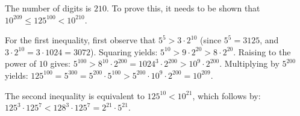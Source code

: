 The number of digits is $210$.
To prove this, it needs to be shown that
$10^{209} \leq 125^{100} < 10^{210}$.

For the first inequality, first observe that $5^5 > 3 \cdot 2^{10}$
(since $5^5 = 3125$, and $3 \cdot 2^{10} = 3 \cdot 1024 = 3072$).
Squaring yields:
$5^{10}
 > 9 \cdot 2^{20}
 > 8 \cdot 2^{20}$.
Raising to the power of $10$ gives:
$5^{100}
 > 8^{10} \cdot 2^{200}
 = 1024^3 \cdot 2^{200}
 > 10^9 \cdot 2^{200}$.
Multiplying by $5^{200}$ yields:
$125^{100}
 = 5^{300}
 = 5^{200} \cdot 5^{100}
 > 5^{200} \cdot 10^{9} \cdot 2^{200}
 = 10^{209}$.

The second inequality is equivalent to $125^{10} < 10^{21}$,
which follows by:
$125^3 \cdot 125^7
 < 128^3 \cdot 125^7
 = 2^{21} \cdot 5^{21}$.
